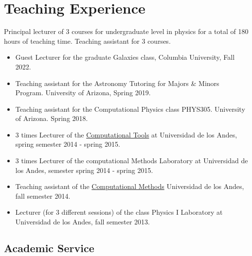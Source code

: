 \documentclass[14pt]{article}
\begin{document}
\section*{Teaching Experience}

Principal lecturer of 3 courses for undergraduate level in physics for a total
of 180 hours of teaching time. Teaching assistant for 3 courses.

\begin{itemize}
  \setlength\itemsep{0.0em}
  \renewcommand\labelitemi{$\cdot$}
\item Guest Lecturer for the graduate Galaxies class, Columbia University, Fall 2022.
\item Teaching assistant for the Astronomy Tutoring for Majors \& Minors Program. University of Arizona, Spring 2019. 
\item Teaching assistant for the Computational Physics class  PHYS305. University of Arizona. Spring 2018.
\item 3 times Lecturer of the \href{https://github.com/ComputoCienciasUniandes/HerramientasComputacionales}{Computational
  Tools} at Universidad de los Andes, spring semester 2014 - spring 2015.
\item 3 times Lecturer of the computational Methods Laboratory at Universidad de los Andes, semester spring 2014 -  spring 2015.
\item Teaching assistant of the
  \href{https://github.com/ComputoCienciasUniandes/MetodosComputacionales}{Computational
  Methods} Universidad de los Andes, fall  semester 2014.
\item Lecturer (for 3 different sessions) of the class Physics I Laboratory at Universidad de los Andes, fall semester 2013.
\end{itemize}


\subsection*{Academic Service} 
\end{document}
